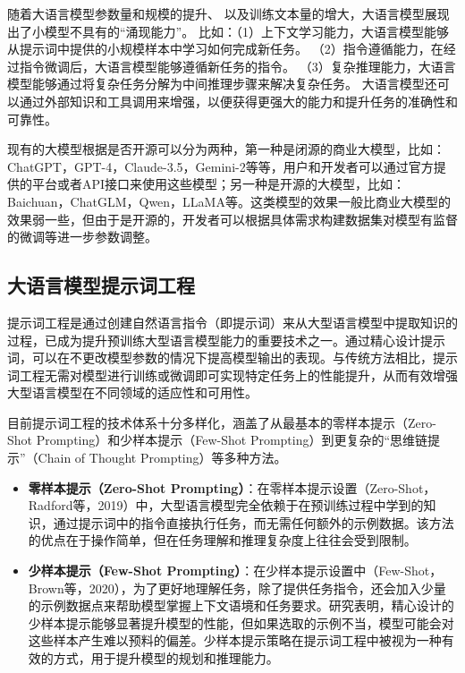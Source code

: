 随着大语言模型参数量和规模的提升、
以及训练文本量的增大，大语言模型展现出了小模型不具有的“涌现能力”。
比如：（1）上下文学习能力，大语言模型能够从提示词中提供的小规模样本中学习如何完成新任务。
（2）指令遵循能力，在经过指令微调后，大语言模型能够遵循新任务的指令。
（3）复杂推理能力，大语言模型能够通过将复杂任务分解为中间推理步骤来解决复杂任务。
大语言模型还可以通过外部知识和工具调用来增强，以便获得更强大的能力和提升任务的准确性和可靠性。

现有的大模型根据是否开源可以分为两种，第一种是闭源的商业大模型，比如：ChatGPT，GPT-4\cite{OpenAI2023}，Claude-3.5，Gemini-2等等，用户和开发者可以通过官方提供的平台或者API接口来使用这些模型；另一种是开源的大模型，比如：Baichuan\cite{Yang2023}，ChatGLM\cite{Zeng2023}，Qwen，LLaMA\cite{Touvron2023}等。这类模型的效果一般比商业大模型的效果弱一些，但由于是开源的，开发者可以根据具体需求构建数据集对模型有监督的微调等进一步参数调整。

\subsection{大语言模型提示词工程}

提示词工程是通过创建自然语言指令（即提示词）来从大型语言模型中提取知识的过程，已成为提升预训练大型语言模型能力的重要技术之一。通过精心设计提示词，可以在不更改模型参数的情况下提高模型输出的表现。与传统方法相比，提示词工程无需对模型进行训练或微调即可实现特定任务上的性能提升，从而有效增强大型语言模型在不同领域的适应性和可用性。

目前提示词工程的技术体系十分多样化，涵盖了从最基本的零样本提示（Zero-Shot Prompting）和少样本提示（Few-Shot Prompting）到更复杂的“思维链提示”（Chain of Thought Prompting）等多种方法。

\begin{itemize}
    \item \textbf{零样本提示（Zero-Shot Prompting）}：在零样本提示设置（Zero-Shot，Radford等，2019）中，大型语言模型完全依赖于在预训练过程中学到的知识，通过提示词中的指令直接执行任务，而无需任何额外的示例数据。该方法的优点在于操作简单，但在任务理解和推理复杂度上往往会受到限制。
    \item \textbf{少样本提示（Few-Shot Prompting）}：在少样本提示设置中（Few-Shot，Brown等，2020），为了更好地理解任务，除了提供任务指令，还会加入少量的示例数据点来帮助模型掌握上下文语境和任务要求。研究表明，精心设计的少样本提示能够显著提升模型的性能，但如果选取的示例不当，模型可能会对这些样本产生难以预料的偏差。少样本提示策略在提示词工程中被视为一种有效的方式，用于提升模型的规划和推理能力。
\end{itemize}

